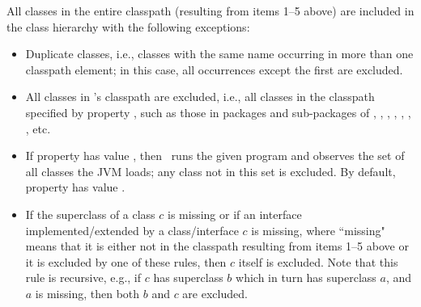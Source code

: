 All classes in the entire classpath (resulting from items 1--5 above) are included in the class hierarchy
with the following exceptions:
\begin{itemize}
\item
Duplicate classes, i.e., classes with the same name occurring in more than one classpath element;
in this case, all occurrences except the first are excluded. 
\item
All classes in \Chord's classpath are excluded, i.e., all classes in the classpath specified by property ,
such as those in packages and sub-packages of , , , , , , , etc.
\item
If property  has value , then \Chord\ runs the given program and
observes the set of all classes the JVM loads; any class not in this set is excluded.
By default, property  has value .
\item
If the superclass of a class $c$ is missing or if an interface implemented/extended by a class/interface
$c$ is missing, where ``missing" means that it is either not in the classpath resulting from items 1--5 above
or it is excluded by one of these rules, then $c$ itself is excluded.  Note that this rule is recursive, e.g.,
if $c$ has superclass $b$ which in turn has superclass $a$, and $a$ is missing, then both $b$ and $c$ are
excluded.
\end{itemize}



